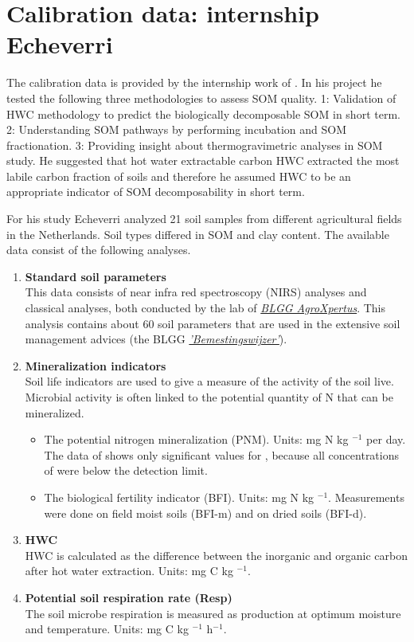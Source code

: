 \documentclass[10pt,twoside,dutch,english]{report}
\begin{document}
\section{Calibration data: internship Echeverri}
The calibration data is provided by the internship work of  \citet{Echeverri2014}. In his project he tested the following three methodologies to assess SOM quality. 1: Validation of  HWC methodology to predict the biologically decomposable SOM in short term. 2: Understanding SOM pathways by performing incubation and SOM fractionation. 3: Providing insight about thermogravimetric analyses in SOM study.  He suggested that hot water extractable carbon HWC extracted the most labile carbon fraction of soils and therefore he assumed HWC to be an appropriate indicator of SOM decomposability in short term.

For his study Echeverri analyzed 21 soil samples from different agricultural fields in the Netherlands. Soil types differed in SOM and clay content. 
The available data consist of the following analyses. 

	\begin{enumerate}
	\item \textbf{Standard soil parameters} \\
	This data consists of near infra red spectroscopy (NIRS) analyses and classical analyses, both conducted by the lab of \href{http://blgg.agroxpertus.nl/}{\textit{BLGG AgroXpertus}}. This analysis contains about 60 soil parameters that are used in the extensive soil management advices (the BLGG \href{http://blgg.agroxpertus.nl/product/bemesting/bemestingswijzer-bouwland}{\textit{'Bemestingswijzer'}}). 
	
	\item \textbf{Mineralization indicators}\\
	Soil life indicators are used to give a measure of the activity of the soil live. Microbial activity is often linked to the potential quantity of N that can be mineralized. 
	\begin{itemize}
		\item The potential nitrogen mineralization (PNM).  Units: mg N kg $^{-1}$ per day. The data of \citep{Echeverri2014} shows only significant values for , because all concentrations of  were below the detection limit. 
		\item The biological fertility indicator (BFI). Units: mg N kg $^{-1}$. Measurements were done on field moist soils (BFI-m) and on dried soils (BFI-d). 
	\end{itemize}
	
	\item \textbf{HWC} \\
	HWC is calculated as the difference between the inorganic and organic carbon after hot water extraction. Units: mg C kg $^{-1}$.   
	
	\item \textbf{Potential soil respiration rate (Resp)}\\
	The soil microbe respiration is measured as  production at optimum moisture and temperature. Units: mg C kg $^{-1}$ h$^{-1}$.   
\end{enumerate}
\end{document}
